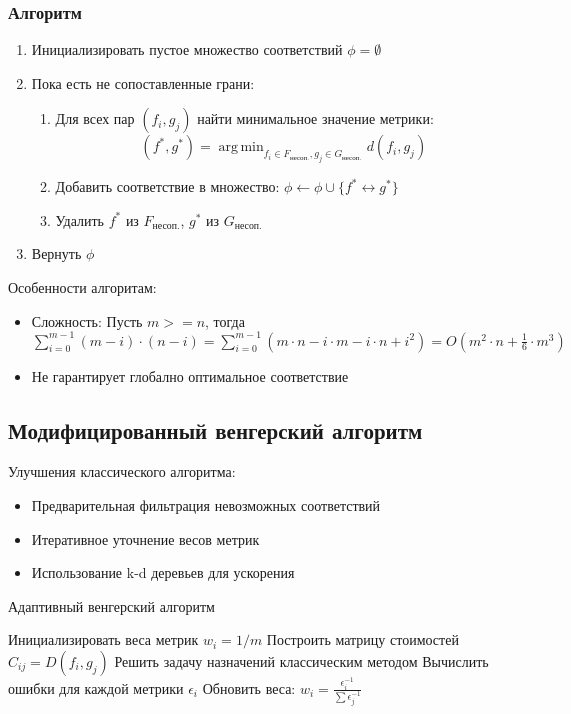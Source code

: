 \documentclass[a4paper,12pt]{article}
\DeclareMathOperator*{\argmin}{arg\,min}
\begin{document}
\subsubsection{Алгоритм}
\begin{enumerate}
    \item Инициализировать пустое множество соответствий $\phi = \emptyset$
    \item Пока есть не сопоставленные грани:
    \begin{enumerate}
        \item Для всех пар $(f_i, g_j)$ найти минимальное значение метрики:
            \[ (f^*, g^*) = \argmin_{f_i \in F_{\text{несоп.}}, g_j \in G_{\text{несоп.}}} d(f_i, g_j) \]
        \item Добавить соответствие в множество: $\phi \leftarrow \phi \cup \{f^* \leftrightarrow g^*\}$
        \item Удалить $f^*$ из $F_{\text{несоп.}}$, $g^*$ из $G_{\text{несоп.}}$
    \end{enumerate}
    \item Вернуть $\phi$
\end{enumerate}

Особенности алгоритам:
\begin{itemize}
    \item Сложность:\newline
        Пусть $m >= n$, тогда \newline
        $\sum\limits_{i = 0}^{m - 1}(m - i) \cdot (n - i) = \sum\limits_{i = 0}^{m - 1}(m \cdot n - i \cdot m 
        - i \cdot n + i^2) = O(m^2 \cdot n + \frac{1}{6} \cdot m^3)$
    \item Не гарантирует глобално оптимальное соответствие
\end{itemize}


\subsection{Модифицированный венгерский алгоритм}
Улучшения классического алгоритма:
\begin{itemize}
    \item Предварительная фильтрация невозможных соответствий
    \item Итеративное уточнение весов метрик
    \item Использование k-d деревьев для ускорения
\end{itemize}

\begin{algorithm}[H]
\caption{Адаптивный венгерский алгоритм}\label{hungarian_adaptive}
\begin{algorithmic}[1]
\State Инициализировать веса метрик $w_i = 1/m$
    \State Построить матрицу стоимостей $C_{ij} = D(f_i, g_j)$
    \State Решить задачу назначений классическим методом
    \State Вычислить ошибки для каждой метрики $\epsilon_i$
    \State Обновить веса: $w_i = \frac{\epsilon_i^{-1}}{\sum \epsilon_j^{-1}}$
\EndWhile
\end{algorithmic}
\end{algorithm}
\end{document}
